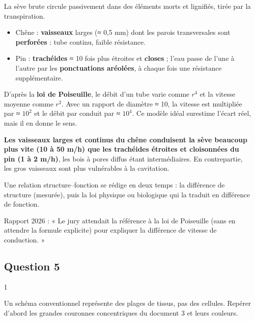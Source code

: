 \documentclass[11pt,a4paper]{article}
\providecommand{\tightlist}{\setlength{\itemsep}{0pt}\setlength{\parskip}{0pt}}
\begin{document}
La sève brute circule passivement dans des éléments morts et lignifiés, tirée par la transpiration.

\begin{itemize}
\tightlist
\item
  Chêne : \textbf{vaisseaux} larges (≈ 0,5 mm) dont les parois transversales sont \textbf{perforées} : tube continu, faible résistance.
\item
  Pin : \textbf{trachéides} ≈ 10 fois plus étroites et \textbf{closes} ; l'eau passe de l'une à l'autre par les \textbf{ponctuations aréolées}, à chaque fois une résistance supplémentaire.
\end{itemize}

D'après la \textbf{loi de Poiseuille}, le débit d'un tube varie comme \(r^4\) et la vitesse moyenne comme \(r^2\). Avec un rapport de diamètre ≈ 10, la vitesse est multipliée par ≈ \(10^2\) et le débit par conduit par ≈ \(10^4\). Ce modèle idéal surestime l'écart réel, mais il en donne le sens.

\textbf{Les vaisseaux larges et continus du chêne conduisent la sève beaucoup plus vite (10 à 50 m/h) que les trachéides étroites et cloisonnées du pin (1 à 2 m/h)}, les bois à pores diffus étant intermédiaires. En contrepartie, les gros vaisseaux sont plus vulnérables à la cavitation.

\begin{methode}

Une relation structure--fonction se rédige en deux temps : la différence de structure (mesurée), puis la loi physique ou biologique qui la traduit en différence de fonction.

\end{methode}

\begin{jury}

Rapport 2026 : « Le jury attendait la référence à la loi de Poiseuille (sans en attendre la formule explicite) pour expliquer la différence de vitesse de conduction. »

\end{jury}

\hypertarget{question-5}{%
\subsection{Question 5}\label{question-5}}

\begin{indication}{1}

Un schéma conventionnel représente des plages de tissus, pas des cellules. Repérer d'abord les grandes couronnes concentriques du document 3 et leurs couleurs.

\end{indication}
\end{document}
